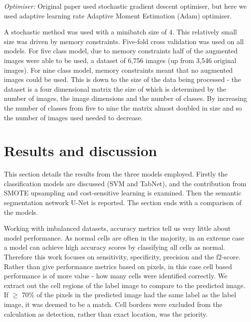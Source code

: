 \documentclass[final,5p,times,twocolumn,authoryear]{elsarticle}
\begin{document}
  \textit{Optimiser: } Original paper used stochastic gradient descent optimiser, but here we used adaptive learning rate Adaptive Moment Estimation (Adam) optimiser.
 
A stochastic method was used with a minibatch size of 4. This relatively small size was driven by memory constraints. Five-fold cross validation was used on all models.
For five class model, due to memory constraints half of the augmented images were able to be used, a dataset of 6,756 images (up from 3,546 original images). For nine class model, memory constraints meant that no augmented images could be used. This is down to the size of the data being processed - the dataset is a four dimensional matrix the size of which is determined by the number of images, the image dimensions and the number of classes. By increasing the number of classes from five to nine the matrix almost doubled in size and so the number of images used needed to decrease.

\section{Results and discussion}
\label{chap:main}

This section details the results from the three models employed. Firstly the classification models are discussed (SVM and TabNet), and the contribution from SMOTE upsampling and cost-sensitive learning is examined. Then the semantic segmentation network U-Net is reported. The section ends with a comparison of the models.

Working with imbalanced datasets, accuracy metrics tell us very little about model performance. As normal cells are often in the majority, in an extreme case a model can achieve high accuracy scores by classifying all cells as normal. Therefore this work focuses on sensitivity, specificity, precision and the f2-score.
Rather than give performance metrics based on pixels, in this case cell based performance is of more value - how many cells were identified correctly. We extract out the cell regions of the label image to compare to the predicted image. If 
$\geqslant$ 70\% of the pixels in the predicted image had the same label as the label image, it was deemed to be a match. Cell borders were excluded from the calculation as detection, rather than exact location, was the priority.
\end{document}

